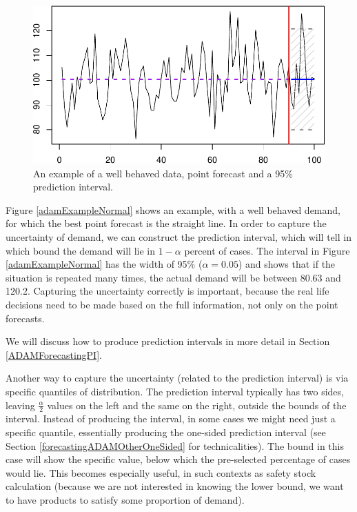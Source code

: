 \documentclass[
]{book}
\theoremstyle{definition}
\theoremstyle{definition}
\theoremstyle{definition}
\theoremstyle{definition}
\theoremstyle{remark}
\begin{document}
\begin{figure}
\centering
\includegraphics{adam_files/figure-latex/adamExampleNormal-1.pdf}
\caption{\label{fig:adamExampleNormal}An example of a well behaved data, point forecast and a 95\% prediction interval.}
\end{figure}

Figure \ref{adamExampleNormal} shows an example, with a well behaved demand, for which the best point forecast is the straight line. In order to capture the uncertainty of demand, we can construct the prediction interval, which will tell in which bound the demand will lie in \(1-\alpha\) percent of cases. The interval in Figure \ref{adamExampleNormal} has the width of 95\% (\(\alpha=0.05\)) and shows that if the situation is repeated many times, the actual demand will be between 80.63 and 120.2. Capturing the uncertainty correctly is important, because the real life decisions need to be made based on the full information, not only on the point forecasts.

We will discuss how to produce prediction intervals in more detail in Section \ref{ADAMForecastingPI}.

Another way to capture the uncertainty (related to the prediction interval) is via specific quantiles of distribution. The prediction interval typically has two sides, leaving \(\frac{\alpha}{2}\) values on the left and the same on the right, outside the bounds of the interval. Instead of producing the interval, in some cases we might need just a specific quantile, essentially producing the one-sided prediction interval (see Section \ref{forecastingADAMOtherOneSided} for technicalities). The bound in this case will show the specific value, below which the pre-selected percentage of cases would lie. This becomes especially useful, in such contexts as safety stock calculation (because we are not interested in knowing the lower bound, we want to have products to satisfy some proportion of demand).
\end{document}
